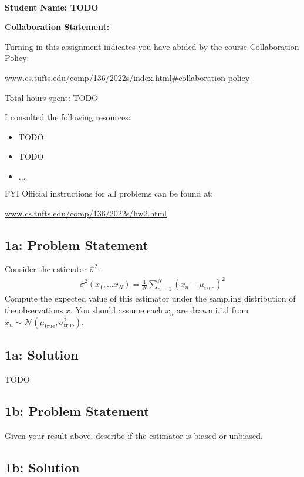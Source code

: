 \documentclass[12pt]{article}
\newcommand{\officialdirections}[1]{{\color{blue} #1}}
\begin{document}
~~\\ %

{\Large{\bf Student Name: TODO}}

{\Large{\bf Collaboration Statement:}}

Turning in this assignment indicates you have abided by the course Collaboration Policy:

\url{www.cs.tufts.edu/comp/136/2022s/index.html#collaboration-policy}

Total hours spent: TODO

I consulted the following resources:
\begin{itemize}
\item TODO
\item TODO
\item $\ldots$	
\end{itemize}

FYI Official instructions for all problems can be found at:

\url{www.cs.tufts.edu/comp/136/2022s/hw2.html}


\tableofcontents

\newpage
\officialdirections{
\subsection*{1a: Problem Statement}

Consider the estimator $\hat{\sigma}^2$:
\begin{align}
\hat{\sigma}^2(x_1, \ldots x_N) = \frac{1}{N} \sum_{n=1}^N (x_n - \mu_{\text{true}})^2
\end{align}
Compute the expected value of this estimator under the sampling distribution of the observations $x$. You should assume each $x_n$ are drawn i.i.d from $x_n \sim \mathcal{N}( \mu_{\text{true}}, \sigma^2_{\text{true}})$.  
}

\subsection{1a: Solution}

TODO


\newpage
\officialdirections{
\subsection*{1b: Problem Statement}
Given your result above, describe if the estimator is biased or unbiased.
}

\subsection{1b: Solution}
\end{document}
